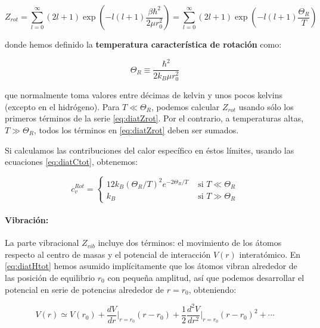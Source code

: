\documentclass[11pt, a4paper]{article} %
\theoremstyle{named}
\begin{document}
            \begin{equation}\label{eq:diatZrot}
                Z_{r o t}=\sum_{l=0}^{\infty}(2 l+1) \exp \left(-l(l+1) \frac{\beta \hbar^{2}}{2 \mu r_{0}^{2}}\right)=\sum_{l=0}^{\infty}(2 l+1) \exp \left(-l(l+1) \frac{\Theta_R}{T}\right)
            \end{equation}

            donde hemos definido la \textbf{temperatura característica de rotación} como:

            \begin{equation}\label{eq:diatTrot}
                \Theta_R \equiv \frac{\hbar^2}{2k_B\mu r_0^2}
            \end{equation}

            que normalmente toma valores entre décimas de kelvin y unos pocos kelvins (excepto en el hidrógeno). Para $T\ll \Theta_R$, podemos calcular $Z_{rot}$ usando sólo los primeros términos de la serie \eqref{eq:diatZrot}. Por el contrario, a temperaturas altas, $T\gg \Theta_R$, todos los términos en \eqref{eq:diatZrot} deben ser sumados.

            Si calculamos las contribuciones del calor específico en éstos límites, usando las ecuaciones \eqref{eq:diatCtot}, obtenemos:

            \begin{equation}\label{eq:diatCrot}
                c_{v}^{Rot}=\left\{\begin{array}{ll}
                12 k_{B}\left(\Theta_{R} / T\right)^{2} e^{-2 \Theta_{R} / T} & \text { si } T \ll \Theta_{R} \\
                k_{B} & \text { si } T \gg \Theta_{R}
                \end{array}\right.
            \end{equation}

            \paragraph{Vibración:} La parte vibracional $Z_{vib}$ incluye dos términos: el movimiento de los átomos respecto al centro de masas y el potencial de interacción $V(r)$ interatómico. En \eqref{eq:diatHtot} hemos asumido implícitamente que los átomos vibran alrededor de las posición de equilibrio $r_0$ con pequeña amplitud, así que podemos desarrollar el potencial en serie de potencias alrededor de $r = r_0$, obteniendo:

            $$
            V(r) \simeq V\left(r_{0}\right)+\frac{d V}{d r}\bigg\rvert_{r=r_0}\left(r-r_{0}\right)+\frac{1}{2} \frac{d^{2} V}{d r^{2}}\bigg\rvert_{r=r_0}\left(r-r_{0}\right)^{2}+\cdots
            $$
\end{document}
